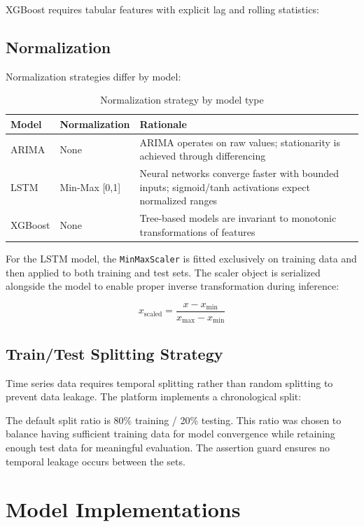 XGBoost requires tabular features with explicit lag and rolling statistics:


\subsection{Normalization}

Normalization strategies differ by model:

\begin{table}[h]
\centering
\begin{tabular}{|l|l|p{6cm}|}
\hline
\textbf{Model} & \textbf{Normalization} & \textbf{Rationale} \\
\hline
ARIMA & None & ARIMA operates on raw values; stationarity is achieved through differencing \\
\hline
LSTM & Min-Max [0,1] & Neural networks converge faster with bounded inputs; sigmoid/tanh activations expect normalized ranges \\
\hline
XGBoost & None & Tree-based models are invariant to monotonic transformations of features \\
\hline
\end{tabular}
\caption{Normalization strategy by model type}
\label{tab:normalization}
\end{table}

For the LSTM model, the \texttt{MinMaxScaler} is fitted exclusively on training data and then applied to both training and test sets. The scaler object is serialized alongside the model to enable proper inverse transformation during inference:

$$x_{\text{scaled}} = \frac{x - x_{\min}}{x_{\max} - x_{\min}}$$

\subsection{Train/Test Splitting Strategy}

Time series data requires temporal splitting rather than random splitting to prevent data leakage. The platform implements a chronological split:


The default split ratio is 80\% training / 20\% testing. This ratio was chosen to balance having sufficient training data for model convergence while retaining enough test data for meaningful evaluation. The assertion guard ensures no temporal leakage occurs between the sets.


\section{Model Implementations}
\label{sec:models}

